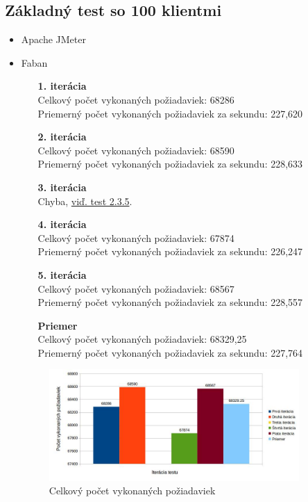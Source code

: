 \documentclass[12pt,oneside,final]{fithesis-utf8}
\begin{document}
\subsection{Základný test so 100 klientmi}

\begin{itemize}

\item Apache JMeter

\item Faban

\begin{itemize}

\item[\textbf{1. iterácia}]\ \\
Celkový počet vykonaných požiadaviek: 68286\\
Priemerný počet vykonaných požiadaviek za sekundu: 227,620

\item[\textbf{2. iterácia}]\ \\
Celkový počet vykonaných požiadaviek: 68590\\
Priemerný počet vykonaných požiadaviek za sekundu: 228,633

\item[\textbf{3. iterácia}]\ \\
Chyba, \hyperlink{label}{viď. test 2.3.5}.

\item[\textbf{4. iterácia}]\ \\
Celkový počet vykonaných požiadaviek: 67874\\
Priemerný počet vykonaných požiadaviek za sekundu: 226,247

\item[\textbf{5. iterácia}]\ \\
Celkový počet vykonaných požiadaviek: 68567\\
Priemerný počet vykonaných požiadaviek za sekundu: 228,557

\item[\textbf{Priemer}]\ \\
Celkový počet vykonaných požiadaviek: 68329,25\\
Priemerný počet vykonaných požiadaviek za sekundu: 227,764

\end{itemize}

\begin{figure}[H]
  \centering
      \includegraphics[width=0.9\textwidth]{faban5.jpg}
  \caption{Celkový počet vykonaných požiadaviek}
\end{figure}


\end{itemize}
\end{document}
